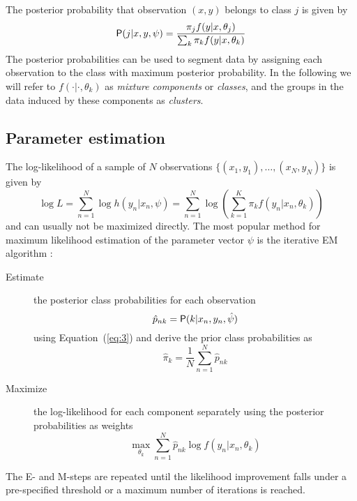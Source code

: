\documentclass{jss}
\begin{document}
The posterior probability that observation $(x,y)$ belongs to class
$j$ is given by
\begin{equation}\label{eq:3}
  \mathsf{P}(j|x, y, \psi) =
  \frac{\pi_j f(y | x, \theta_j)}{\sum_k \pi_k f(y | x, \theta_k)}
\end{equation}
The posterior probabilities can be used to segment data by assigning
each observation to the class with maximum posterior probability.  In
the following we will refer to $f(\cdot|\cdot, \theta_k)$ as
\emph{mixture components} or \emph{classes}, and the groups in the
data induced by these components as \emph{clusters}.

\subsection{Parameter estimation}
\label{sec:parameter-estimation}

The log-likelihood of a sample of $N$ observations
$\{(x_1,y_1),\ldots,(x_N,y_N)\}$ is given by
\begin{equation}\label{eq:4}
  \log L = \sum_{n=1}^N \log h(y_n|x_n,\psi) =
  \sum_{n=1}^N \log\left(\sum_{k = 1}^K \pi_kf(y_n|x_n,\theta_k) \right)
\end{equation}
and can usually not be maximized directly. The most popular method for
maximum likelihood estimation of the parameter vector $\psi$ is the
iterative EM algorithm \citep{flm:Dempster+Laird+Rubin:1977}: 
\begin{description}
 \item[Estimate] the posterior class probabilities for each observation
  \begin{displaymath}
    \hat p_{nk} = \mathsf{P}(k|x_n, y_n, \hat \psi)
  \end{displaymath}
  using Equation~(\ref{eq:3}) and derive the prior class probabilities as
  \begin{displaymath}
    \hat\pi_k = \frac1N \sum_{n=1}^N \hat p_{nk}
  \end{displaymath}

 \item[Maximize] the log-likelihood for each component separately using the
  posterior probabilities as weights
  \begin{equation}\label{eq:2}
    \max_{\theta_k} \sum_{n=1}^N \hat p_{nk} \log f(y_n | x_n, \theta_k)  
  \end{equation}
\end{description}
The E- and M-steps are repeated until the likelihood improvement falls
under a pre-specified threshold or a maximum number of iterations is
reached.
\end{document}
